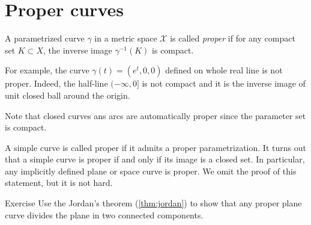 \section{Proper curves}

A parametrized curve $\gamma$ in a metric space $\mathcal{X}$ is called \emph{proper} if for any compact set $K \subset X$, the inverse image $\gamma^{-1}(K)$ is compact.

For example, the curve $\gamma(t)=(e^t,0,0)$ defined on whole real line is not proper.
Indeed, the half-line $(-\infty,0]$ is not compact and it is the inverse image of unit closed ball around the origin.  

Note that closed curves ans arcs are automatically proper since the parameter set is compact.

A simple curve is called proper if it admits a proper parametrization.
It turns out that a simple curve is proper if and only if its image is a closed set.
In particular, any implicitly defined plane or space curve is proper.
We omit the proof of this statement, but it is not hard. %

\begin{thm}{Exercise}\label{ex:proper-curve}
Use the Jordan's theorem (\ref{thm:jordan}) to show that any proper plane curve divides the plane in two connected components.  
\end{thm}



